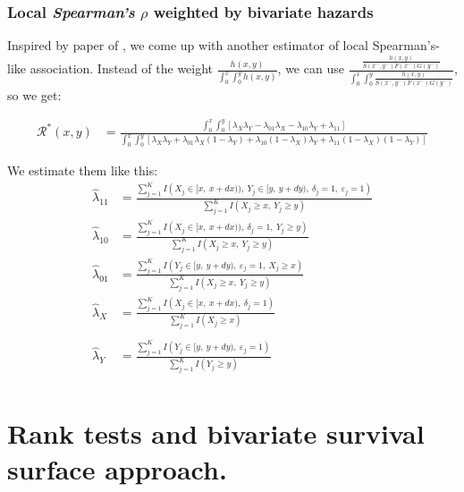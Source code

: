 \documentclass[]{article}
\let\epsilon\varepsilon
\begin{document}
\subsubsection{Local  \emph{Spearman's} $\rho$ weighted by bivariate hazards}
Inspired by paper of \cite{fan2000class}, we come up with another estimator of local Spearman's-like association. Instead of the weight $\frac{h(x, y)}{\int_0^x \int_0^y h(x, y)}$, we can use $\frac{\frac{h(x, y)}{S(x^-, y^-)F(x^-)G(y^-)}}{\int_0^x \int_0^y \frac{h(x, y)}{S(x^-, y^-)F(x^-)G(y^-)}}$, so we get:

	$$
	\begin{aligned}
		\mathcal{R}^*(x, y) &=
    \frac{\int_0^x \int_0^y [\lambda_X \lambda_Y -\lambda_{01}\lambda_X-\lambda_{10}\lambda_Y +\lambda_{11}]}{\int_0^x \int_0^y [\lambda_X \lambda_Y+\lambda_{01}\lambda_X(1 - \lambda_Y)+\lambda_{10}(1 - \lambda_X)\lambda_Y+\lambda_{11}(1 - \lambda_X)(1 - \lambda_Y)]}
	\end{aligned}
	$$

We estimate them like this:
	$$
	\begin{aligned}
		\hat{\lambda}_{11} &= \frac{\sum_{j = 1}^K I \left(X_j \in [x,~x+dx)),~Y_j \in [y,~y+dy),~\delta_j = 1,~\epsilon_j = 1  \right) }{\sum_{j = 1}^K I \left(X_j \geq x,~ Y_j\geq y   \right) }\\
    \hat{\lambda}_{10} &= \frac{\sum_{j = 1}^K I \left(X_j \in [x,~x+dx)),~\delta_j = 1,~ Y_j\geq y   \right) }{\sum_{j = 1}^K I \left(X_j \geq x,~ Y_j\geq y   \right) }\\
    \hat{\lambda}_{01}  &= \frac{\sum_{j = 1}^K I \left(Y_j \in [y,~y+dy),~\epsilon_j = 1,~X_j \geq x \right) }{\sum_{j = 1}^K I \left(X_j \geq x,~ Y_j\geq y   \right) }\\
    \hat{\lambda}_X &= \frac{\sum_{j = 1}^K I \left(X_j \in [x,~x+dx),~\delta_j = 1 \right) }{\sum_{j = 1}^K I \left(X_j \geq x   \right) }\\\\
    \hat{\lambda}_Y &= \frac{\sum_{j = 1}^K I \left(Y_j \in [y,~y+dy),~\epsilon_j = 1 \right) }{\sum_{j = 1}^K I \left(Y_j\geq y   \right) }\\
	\end{aligned}
	$$


\section{Rank tests and bivariate survival surface approach.}
\end{document}
